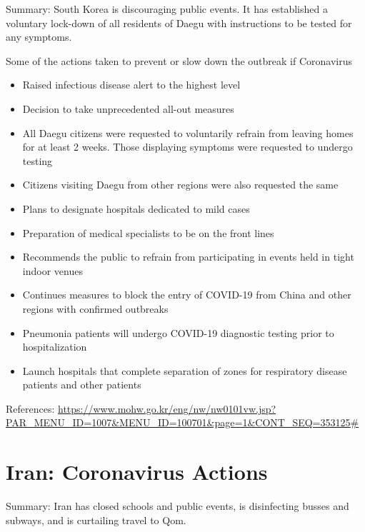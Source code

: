 \documentclass[onecolumn,journal]{IEEEtran}
\begin{document}
Summary: South Korea is discouraging public events. It has established a voluntary lock-down of all residents of Daegu with instructions to be tested for any symptoms. 
 
Some of the actions taken to prevent or slow down the outbreak if Coronavirus
\begin{itemize}
\item Raised infectious disease alert to the highest level
\item Decision to take unprecedented all-out measures 
\item All Daegu citizens were requested to voluntarily refrain from leaving homes for at least 2 weeks. Those displaying symptoms were requested to undergo testing
\item Citizens visiting Daegu from other regions were also requested the same
\item Plans to designate hospitals dedicated to mild cases
\item Preparation of medical specialists to be on the front lines
\item Recommends the public to refrain from participating in events held in tight indoor venues
\item Continues measures to block the entry of COVID-19 from China and other regions with confirmed outbreaks
\item Pneumonia patients will undergo COVID-19 diagnostic testing prior to hospitalization
\item Launch hospitals that complete separation of zones for respiratory disease patients and other patients
\end{itemize}

References: \url{https://www.mohw.go.kr/eng/nw/nw0101vw.jsp?PAR_MENU_ID=1007&MENU_ID=100701&page=1&CONT_SEQ=353125#}

\section*{Iran: Coronavirus Actions}

Summary: Iran has closed schools and public events, is disinfecting busses and subways, and is curtailing travel to Qom.  
 
\end{document}
